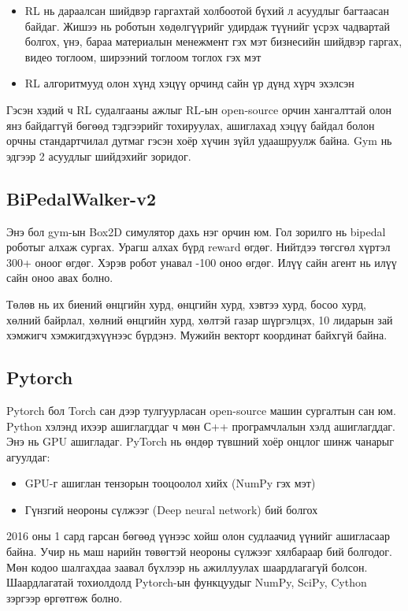 \documentclass[12pt,A4]{report}
\begin{document}
\begin{itemize}
	\item RL нь дараалсан шийдвэр гаргахтай холбоотой бүхий л асуудлыг багтаасан байдаг. Жишээ нь роботын хөдөлгүүрийг удирдаж түүнийг үсрэх чадвартай болгох, үнэ, бараа материалын менежмент гэх мэт бизнесийн шийдвэр гаргах, видео тоглоом, ширээний тоглоом тоглох гэх мэт
	\item RL алгоритмууд олон хүнд хэцүү орчинд сайн үр дүнд хүрч эхэлсэн
\end{itemize} 

Гэсэн хэдий ч RL судалгааны ажлыг RL-ын open-source орчин хангалттай олон янз байдаггүй бөгөөд тэдгээрийг тохируулах, ашиглахад хэцүү байдал болон орчны стандартчилал дутмаг гэсэн хоёр хүчин зүйл удаашруулж байна. Gym нь эдгээр 2 асуудлыг шийдэхийг зоридог.

\subsection{BiPedalWalker-v2}

Энэ бол gym-ын Box2D симулятор дахь нэг орчин юм. Гол зорилго нь bipedal роботыг алхаж сургах. Урагш алхах бүрд reward өгдөг. Нийтдээ төгсгөл хүртэл 300+ оноог өгдөг. Хэрэв робот унавал -100 оноо өгдөг. Илүү сайн агент нь илүү сайн оноо авах болно. 

Төлөв нь их биений өнцгийн хурд, өнцгийн хурд, хэвтээ хурд, босоо хурд, хөлний байрлал, хөлний өнцгийн хурд, хөлтэй газар шүргэлцэх, 10 лидарын зай хэмжигч хэмжигдэхүүнээс бүрдэнэ. Мужийн векторт координат байхгүй байна.

\subsection{Pytorch}

Pytorch бол Torch сан дээр тулгуурласан open-source машин сургалтын сан юм. Python хэлэнд ихээр ашиглагддаг ч мөн С++ програмчлалын хэлд ашиглагддаг. Энэ нь GPU ашигладаг. PyTorch нь өндөр түвшний хоёр онцлог шинж чанарыг агуулдаг:

\begin{itemize}
	\item GPU-г ашиглан тензорын тооцоолол хийх (NumPy гэх мэт) 
	\item Гүнзгий неороны сүлжээг (Deep neural network) бий болгох
\end{itemize}

2016 оны 1 сард гарсан бөгөөд үүнээс хойш олон судлаачид үүнийг ашигласаар байна. Учир нь маш нарийн төвөгтэй неороны сүлжээг хялбараар бий болгодог. Мөн кодоо шалгахдаа заавал бүхлээр нь ажиллуулах шаардлагагүй болсон. Шаардлагатай тохиолдолд Pytorch-ын функцуудыг NumPy, SciPy, Cython зэргээр өргөтгөж болно. 
 
\end{document}
